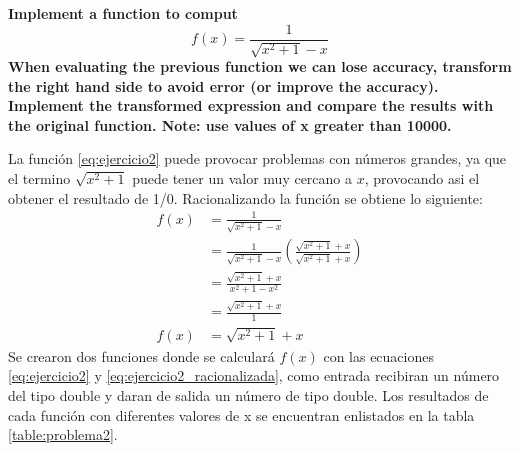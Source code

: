 \item \textbf{Implement a function to comput
    \begin{equation}
        f(x)=\frac{1}{\sqrt{x^2+1}-x}
        \label{eq:ejercicio2}
    \end{equation}
    When evaluating the previous function we can lose accuracy, transform the right hand side to avoid error (or improve the accuracy). Implement the transformed expression and compare the results with the original function. Note: use values of x greater than 10000.}

La función \ref{eq:ejercicio2} puede provocar problemas con números grandes, ya que el termino $\sqrt{x^2+1}$ puede tener un valor muy cercano a $x$, provocando asi el obtener el resultado de 1/0. Racionalizando la función se obtiene lo siguiente:
\begin{align}
    f(x) & = \frac{1}{\sqrt{x^2+1}-x}                                                     \nonumber \\
         & = \frac{1}{\sqrt{x^2+1}-x} \left(\frac{\sqrt{x^2+1}+x}{\sqrt{x^2+1}+x} \right) \nonumber \\
         & = \frac{\sqrt{x^2+1}+x}{x^2+1-x^2}                                             \nonumber \\
         & = \frac{\sqrt{x^2+1}+x}{1}                                                     \nonumber \\
    f(x) & = \sqrt{x^2+1}+x \label{eq:ejercicio2_racionalizada}
\end{align}
Se crearon dos funciones donde se calculará $f(x)$ con las ecuaciones \ref{eq:ejercicio2} y \ref{eq:ejercicio2_racionalizada}, como entrada recibiran un número del tipo double y daran de salida un número de tipo double. Los resultados de cada función con diferentes valores de x se encuentran enlistados en la tabla \ref{table:problema2}.

